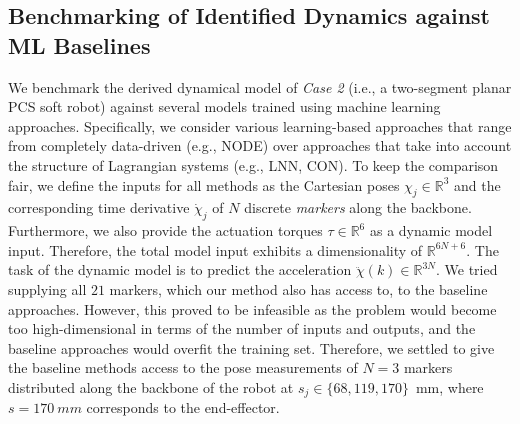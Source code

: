 \subsection{Benchmarking of Identified Dynamics against ML Baselines}
We benchmark the derived dynamical model of \emph{Case 2} (i.e., a two-segment planar \gls{PCS} soft robot) against several models trained using machine learning approaches. Specifically, we consider various learning-based approaches that range from completely data-driven (e.g., \gls{NODE}) over approaches that take into account the structure of Lagrangian systems (e.g., \gls{LNN}, \gls{CON}).
To keep the comparison fair, we define the inputs for all methods as the Cartesian poses $\chi_j \in \mathbb{R}^3$ and the corresponding time derivative $\dot{\chi}_j$ of $N$ discrete \emph{markers} along the backbone. Furthermore, we also provide the actuation torques $\tau \in \mathbb{R}^6$ as a dynamic model input. Therefore, the total model input exhibits a dimensionality of $\mathbb{R}^{6N + 6}$. The task of the dynamic model is to predict the acceleration $\ddot{\chi}(k) \in \mathbb{R}^{3N}$. %
We tried supplying all $21$ markers, which our method also has access to, to the baseline approaches. However, this proved to be infeasible as the problem would become too high-dimensional in terms of the number of inputs and outputs, and the baseline approaches would overfit the training set. Therefore, we settled to give the baseline methods access to the pose measurements of $N=3$ markers distributed along the backbone of the robot at $s_j \in \{ 68, 119, 170 \}$~\si{mm}, where $s=\SI{170}{mm}$ corresponds to the end-effector.

